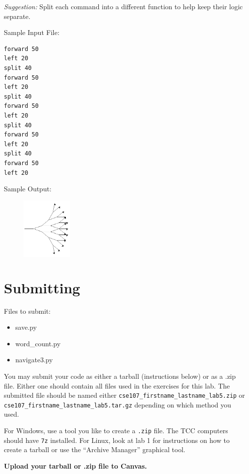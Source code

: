 \documentclass[11pt]{cselabheader}
\begin{document}
\begin{description}
  \emph{Suggestion:} Split each command into a different function to help keep their logic separate.

  Sample Input File:
  \begin{lstlisting}[style=python]
forward 50
left 20
split 40
forward 50
left 20
split 40
forward 50
left 20
split 40
forward 50
left 20
split 40
forward 50
left 20
  \end{lstlisting}

  Sample Output:
  \begin{figure}[!h]
    \centering
    \includegraphics[width=1.0in]{img/nav3_example}
  \end{figure}
\end{description}

\section{Submitting}

Files to submit:
\begin{itemize}
\item save.py
\item word\_count.py
\item navigate3.py
\end{itemize}

You may submit your code as either a tarball (instructions below) or as a .zip
file. Either one should contain all files used in the exercises for this lab.
The submitted file should be named either
\texttt{cse107\_firstname\_lastname\_lab5.zip} or
\texttt{cse107\_firstname\_lastname\_lab5.tar.gz} depending on which method you
used.

For Windows, use a tool you like to create a \texttt{.zip} file. The TCC
computers should have \texttt{7z} installed. For Linux, look at lab 1 for
instructions on how to create a tarball or use the ``Archive Manager'' graphical
tool.

\begin{center}
  \textbf{Upload your tarball or .zip file to Canvas.}
\end{center}
\end{document}
